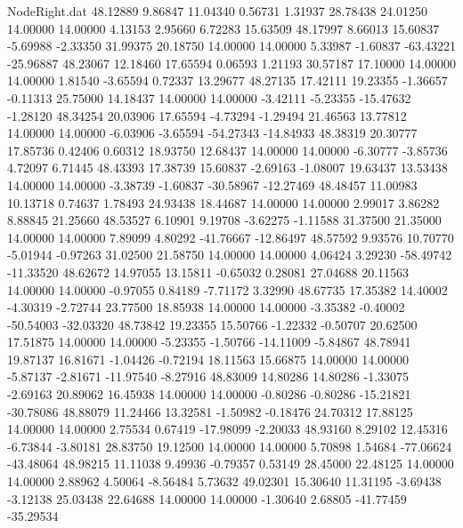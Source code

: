 \begin{filecontents}{NodeRight.dat}
  48.12889    9.86847   11.04340     0.56731    1.31937   28.78438   24.01250   14.00000   14.00000    4.13153    2.95660    6.72283   15.63509
  48.17997    8.66013   15.60837    -5.69988   -2.33350   31.99375   20.18750   14.00000   14.00000    5.33987   -1.60837  -63.43221  -25.96887
  48.23067   12.18460   17.65594     0.06593    1.21193   30.57187   17.10000   14.00000   14.00000    1.81540   -3.65594    0.72337   13.29677
  48.27135   17.42111   19.23355    -1.36657   -0.11313   25.75000   14.18437   14.00000   14.00000   -3.42111   -5.23355  -15.47632   -1.28120
  48.34254   20.03906   17.65594    -4.73294   -1.29494   21.46563   13.77812   14.00000   14.00000   -6.03906   -3.65594  -54.27343  -14.84933
  48.38319   20.30777   17.85736     0.42406    0.60312   18.93750   12.68437   14.00000   14.00000   -6.30777   -3.85736    4.72097    6.71445
  48.43393   17.38739   15.60837    -2.69163   -1.08007   19.63437   13.53438   14.00000   14.00000   -3.38739   -1.60837  -30.58967  -12.27469
  48.48457   11.00983   10.13718     0.74637    1.78493   24.93438   18.44687   14.00000   14.00000    2.99017    3.86282    8.88845   21.25660
  48.53527    6.10901    9.19708    -3.62275   -1.11588   31.37500   21.35000   14.00000   14.00000    7.89099    4.80292  -41.76667  -12.86497
  48.57592    9.93576   10.70770    -5.01944   -0.97263   31.02500   21.58750   14.00000   14.00000    4.06424    3.29230  -58.49742  -11.33520
  48.62672   14.97055   13.15811    -0.65032    0.28081   27.04688   20.11563   14.00000   14.00000   -0.97055    0.84189   -7.71172    3.32990
  48.67735   17.35382   14.40002    -4.30319   -2.72744   23.77500   18.85938   14.00000   14.00000   -3.35382   -0.40002  -50.54003  -32.03320
  48.73842   19.23355   15.50766    -1.22332   -0.50707   20.62500   17.51875   14.00000   14.00000   -5.23355   -1.50766  -14.11009   -5.84867
  48.78941   19.87137   16.81671    -1.04426   -0.72194   18.11563   15.66875   14.00000   14.00000   -5.87137   -2.81671  -11.97540   -8.27916
  48.83009   14.80286   14.80286    -1.33075   -2.69163   20.89062   16.45938   14.00000   14.00000   -0.80286   -0.80286  -15.21821  -30.78086
  48.88079   11.24466   13.32581    -1.50982   -0.18476   24.70312   17.88125   14.00000   14.00000    2.75534    0.67419  -17.98099   -2.20033
  48.93160    8.29102   12.45316    -6.73844   -3.80181   28.83750   19.12500   14.00000   14.00000    5.70898    1.54684  -77.06624  -43.48064
  48.98215   11.11038    9.49936    -0.79357    0.53149   28.45000   22.48125   14.00000   14.00000    2.88962    4.50064   -8.56484    5.73632
  49.02301   15.30640   11.31195    -3.69438   -3.12138   25.03438   22.64688   14.00000   14.00000   -1.30640    2.68805  -41.77459  -35.29534

\end{filecontents}
